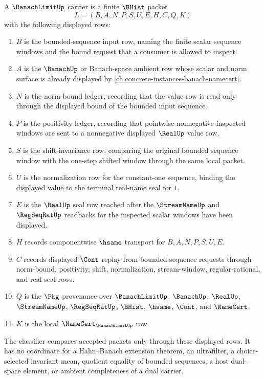 \begin{definition}
\label{def:banach-limit-carrier}
A $\BanachLimitUp$ carrier is a finite $\BHist$ packet
$$
L=(B,A,N,P,S,U,E,H,C,Q,K)
$$
with the following displayed rows:
\begin{enumerate}
\item $B$ is the bounded-sequence input row, naming the finite scalar sequence windows and the bound request that a consumer is allowed to inspect.
\item $A$ is the $\BanachUp$ or Banach-space ambient row whose scalar and norm surface is already displayed by \autoref{ch:concrete-instances-banach-namecert}.
\item $N$ is the norm-bound ledger, recording that the value row is read only through the displayed bound of the bounded input sequence.
\item $P$ is the positivity ledger, recording that pointwise nonnegative inspected windows are sent to a nonnegative displayed $\RealUp$ value row.
\item $S$ is the shift-invariance row, comparing the original bounded sequence window with the one-step shifted window through the same local packet.
\item $U$ is the normalization row for the constant-one sequence, binding the displayed value to the terminal real-name seal for $1$.
\item $E$ is the $\RealUp$ seal row reached after the $\StreamNameUp$ and $\RegSeqRatUp$ readbacks for the inspected scalar windows have been displayed.
\item $H$ records componentwise $\hsame$ transport for $B,A,N,P,S,U,E$.
\item $C$ records displayed $\Cont$ replay from bounded-sequence requests through norm-bound, positivity, shift, normalization, stream-window, regular-rational, and real-seal rows.
\item $Q$ is the $\Pkg$ provenance over $\BanachLimitUp$, $\BanachUp$, $\RealUp$, $\StreamNameUp$, $\RegSeqRatUp$, $\BHist$, $\hsame$, $\Cont$, and $\NameCert$.
\item $K$ is the local $\NameCert_{\BanachLimitUp}$ row.
\end{enumerate}
The classifier compares accepted packets only through these displayed rows. It has no coordinate for a Hahn--Banach extension theorem, an ultrafilter, a choice-selected invariant mean, quotient equality of bounded sequences, a host dual-space element, or ambient completeness of a dual carrier.
\end{definition}

